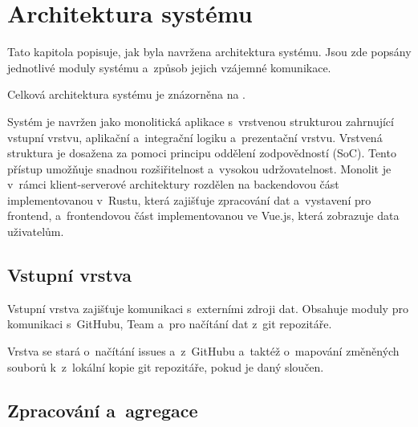 
\section{Architektura systému}
\label{sec:architecture}

Tato kapitola popisuje, jak byla navržena architektura systému. Jsou zde popsány jednotlivé moduly systému a~způsob jejich vzájemné komunikace.

Celková architektura systému je znázorněna na .

Systém je navržen jako monolitická aplikace s~vrstvenou strukturou zahrnující vstupní vrstvu, aplikační a~integrační logiku a~prezentační vrstvu. Vrstvená struktura je dosažena za pomoci principu oddělení zodpovědností (SoC). Tento přístup umožňuje snadnou rozšiřitelnost a~vysokou udržovatelnost. Monolit je v~rámci klient-serverové architektury rozdělen na backendovou část implementovanou v~Rustu, která zajišťuje zpracování dat a~vystavení \API pro frontend, a~frontendovou část implementovanou ve Vue.js, která zobrazuje data uživatelům.

\subsection{Vstupní vrstva}
\label{subsec:architecture:input_layer}

Vstupní vrstva zajišťuje komunikaci s~externími zdroji dat. Obsahuje moduly pro komunikaci s~\API GitHubu, Team \API a~pro načítání dat z~git repozitáře.

Vrstva se stará o~načítání issues a~\PR z~\API GitHubu a~taktéž o~mapování změněných souborů k~\PR z~lokální kopie git repozitáře, pokud je daný \PR sloučen.

\subsection{Zpracování a~agregace}
\label{subsec:architecture:processing}

